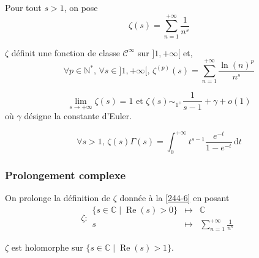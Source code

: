   \begin{definition}
    \label{244-6}
    Pour tout $s > 1$, on pose
    \[ \zeta(s) = \sum_{n=1}^{+\infty} \frac{1}{n^s} \]
  \end{definition}

  \begin{proposition}
    $\zeta$ définit une fonction de classe $\mathcal{C}^\infty$ sur $]1, +\infty[$ et,
    \[ \forall p \in \mathbb{N}^*, \, \forall s \in ]1, +\infty[, \, \zeta^{(p)}(s) = \sum_{n=1}^{+\infty} \frac{\ln(n)^p}{n^s} \]
  \end{proposition}

  \begin{proposition}
    \[ \lim_{s \rightarrow +\infty} \zeta(s) = 1 \text{ et } \zeta(s) \sim_{1^+} \frac{1}{s-1} + \gamma + o(1) \]
    où $\gamma$ désigne la constante d'Euler.
  \end{proposition}


  \begin{proposition}
    \[ \forall s > 1, \, \zeta(s) \Gamma(s) = \int_0^{+\infty} t^{s-1} \frac{e^{-t}}{1 - e^{-t}} \, \mathrm{d}t \]
  \end{proposition}

  \subsubsection{Prolongement complexe}


  \begin{proposition}
    On prolonge la définition de $\zeta$ donnée à la \cref{244-6} en posant
    \[
      \zeta :
      \begin{array}{ccc}
        \{ s \in \mathbb{C} \mid \operatorname{Re}(s) > 0 \} &\mapsto& \mathbb{C} \\
        s &\mapsto& \sum_{n=1}^{+\infty} \frac{1}{n^s}
      \end{array}
    \]
  \end{proposition}

  \begin{proposition}
    $\zeta$ est holomorphe sur $\{ s \in \mathbb{C} \mid \operatorname{Re}(s) > 1 \}$.
  \end{proposition}


